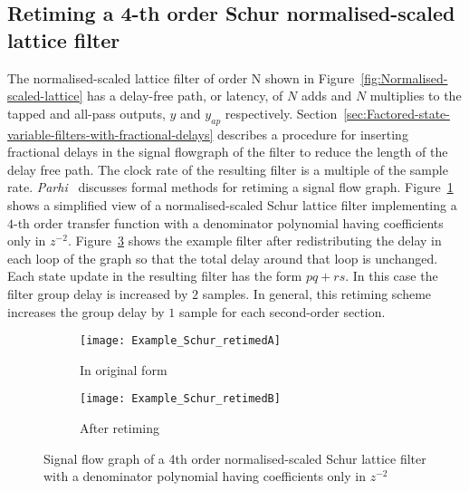 \documentclass[a4paper,twoside,10pt,english]{report}
\begin{document}
\subsection{\label{sec:Retiming-NS-Schur-lattice-filter}Retiming a
4-th order Schur normalised-scaled lattice filter}
The normalised-scaled lattice filter of order N shown in
Figure~\ref{fig:Normalised-scaled-lattice} has a delay-free path, or latency,
of $N$ adds and $N$ multiplies to the tapped and all-pass outputs, $y$ and 
$y_{ap}$ respectively.
Section~\ref{sec:Factored-state-variable-filters-with-fractional-delays}
describes a procedure for inserting fractional delays in the signal flowgraph
of the filter to reduce the length of the delay free path. The clock rate of the
resulting filter is a multiple of the sample rate.
\emph{Parhi}~\cite[Chapter 4]{Parhi_VLSIDigitalSignalProcessingSystems} 
discusses formal methods for retiming a signal flow graph.
Figure~\ref{subfig:example-normalised-scaled-Schur-lattice-filter}
shows a simplified view of a normalised-scaled Schur lattice filter implementing
a $4$-th order transfer function with a denominator polynomial having
coefficients only in $z^{-2}$.
Figure~\ref{subfig:example-normalised-scaled-Schur-lattice-filter-after-retiming}
shows the example filter after redistributing the delay in each loop
of the graph so that the total delay around that loop is unchanged. Each state 
update in the resulting filter has the form \emph{$pq+rs$}. In this case the
filter group delay is increased by $2$ samples. In general, this retiming scheme
increases the group delay by $1$ sample for each second-order section.

\begin{figure}
\begin{subfigure}{\textwidth}
\begin{center}
\texttt{[image: Example\_Schur\_retimedA]}
\caption{In original form}
\label{subfig:example-normalised-scaled-Schur-lattice-filter}
\vspace{1cm}
\end{center}
\end{subfigure}
\begin{subfigure}{\textwidth}
\begin{center}
\texttt{[image: Example\_Schur\_retimedB]}
\caption{After retiming}
\label{subfig:example-normalised-scaled-Schur-lattice-filter-after-retiming}
\end{center}
\end{subfigure}
\caption{Signal flow graph of a 4th order normalised-scaled Schur lattice filter with a denominator polynomial having coefficients only in $z^{-2}$}
\end{figure}
\end{document}
